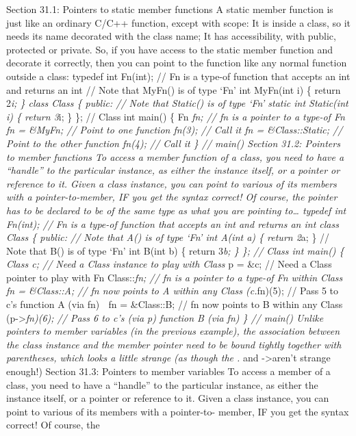 Section 31.1: Pointers to static member functions A static member
function is just like an ordinary C/C++ function, except with scope: It
is inside a class, so it needs its name decorated with the class name;
It has accessibility, with public, protected or private. So, if you have
access to the static member function and decorate it correctly, then you
can point to the function like any normal function outside a class:
typedef int Fn(int); // Fn is a type-of function that accepts an int and
returns an int // Note that MyFn() is of type `Fn' int MyFn(int i) \{
return 2\emph{i; \} class Class \{ public: // Note that Static() is of
type `Fn' static int Static(int i) \{ return 3}i; \} \}; // Class int
main() \{ Fn \emph{fn; // fn is a pointer to a type-of Fn fn = \&MyFn;
// Point to one function fn(3); // Call it fn = \&Class::Static; //
Point to the other function fn(4); // Call it \} // main() Section 31.2:
Pointers to member functions To access a member function of a class, you
need to have a ``handle'' to the particular instance, as either the
instance itself, or a pointer or reference to it. Given a class
instance, you can point to various of its members with a
pointer-to-member, IF you get the syntax correct! Of course, the pointer
has to be declared to be of the same type as what you are pointing
to\ldots{} typedef int Fn(int); // Fn is a type-of function that accepts
an int and returns an int class Class \{ public: // Note that A() is of
type `Fn' int A(int a) \{ return 2}a; \} // Note that B() is of type
`Fn' int B(int b) \{ return 3\emph{b; \} \}; // Class int main() \{
Class c; // Need a Class instance to play with Class }p = \&c; // Need a
Class pointer to play with Fn Class::\emph{fn; // fn is a pointer to a
type-of Fn within Class fn = \&Class::A; // fn now points to A within
any Class (c.}fn)(5); // Pass 5 to c's function A (via fn)  fn =
\&Class::B; // fn now points to B within any Class
(p-\textgreater{}\emph{fn)(6); // Pass 6 to c's (via p) function B (via
fn) \} // main() Unlike pointers to member variables (in the previous
example), the association between the class instance and the member
pointer need to be bound tightly together with parentheses, which looks
a little strange (as though the .} and -\textgreater* aren't strange
enough!) Section 31.3: Pointers to member variables To access a member
of a class, you need to have a ``handle'' to the particular instance, as
either the instance itself, or a pointer or reference to it. Given a
class instance, you can point to various of its members with a
pointer-to- member, IF you get the syntax correct! Of course, the
